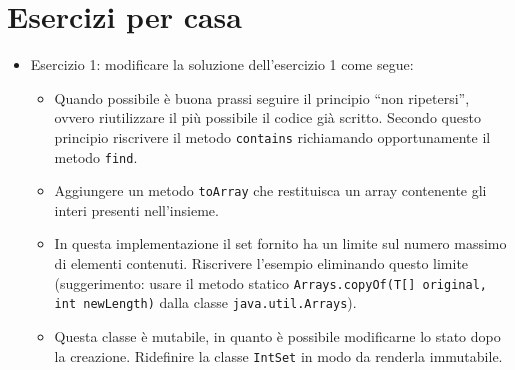 \documentclass{article}
\begin{document}
\section{Esercizi per casa}
\begin{itemize}
\item Esercizio 1: modificare la soluzione dell'esercizio 1 come segue:
\begin{itemize}
	\item Quando possibile è buona prassi seguire il principio ``non ripetersi'', ovvero riutilizzare il più possibile il codice già scritto.
	Secondo questo principio riscrivere il metodo \texttt{contains}
	richiamando opportunamente il metodo \texttt{find}.
	\item Aggiungere un metodo \texttt{toArray} che restituisca un array contenente gli interi presenti nell'insieme.
	\item In questa implementazione il set fornito ha un limite
	sul numero massimo di elementi contenuti.
	Riscrivere l'esempio eliminando questo limite (suggerimento:
	usare il metodo statico \texttt{Arrays.copyOf(T[] original, int newLength)} dalla classe \texttt{java.util.Arrays}).
	\item Questa classe è mutabile, in quanto è possibile modificarne lo stato dopo la creazione. Ridefinire la classe \texttt{IntSet}
	in modo da renderla immutabile.	
\end{itemize}
\end{itemize}

\clearpage







\nocite{*}
\end{document}
